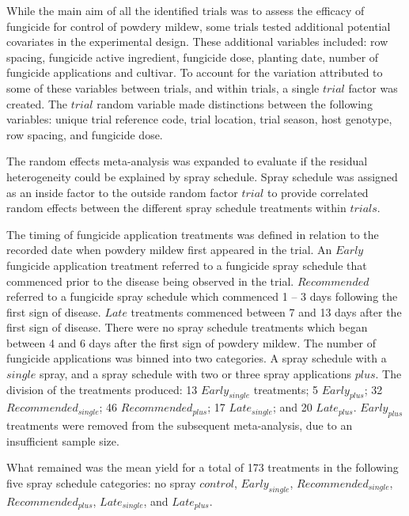 \documentclass[agronomy,article,submit,moreauthors,pdftex]{mdpi}
\begin{document}
While the main aim of all the identified trials was to assess the efficacy of fungicide for control of powdery mildew, some trials tested additional potential covariates in the experimental design.
These additional variables included: row spacing, fungicide active ingredient, fungicide dose, planting date, number of fungicide applications and cultivar.
To account for the variation attributed to some of these variables between trials, and within trials, a single \(trial\) factor was created.
The \(trial\) random variable made distinctions between the following variables: unique trial reference code, trial location, trial season, host genotype, row spacing, and fungicide dose.

The random effects meta-analysis was expanded to evaluate if the residual heterogeneity could be explained by spray schedule.
Spray schedule was assigned as an inside factor to the outside random factor \(trial\) to provide correlated random effects between the different spray schedule treatments within \(trials\).

The timing of fungicide application treatments was defined in relation to the recorded date when powdery mildew first appeared in the trial.
An \(Early\) fungicide application treatment referred to a fungicide spray schedule that commenced prior to the disease being observed in the trial.
\(Recommended\) referred to a fungicide spray schedule which commenced 1 -- 3 days following the first sign of disease.
\(Late\) treatments commenced between 7 and 13 days after the first sign of disease.
There were no spray schedule treatments which began between 4 and 6 days after the first sign of powdery mildew.
The number of fungicide applications was binned into two categories.
A spray schedule with a \(single\) spray, and a spray schedule with two or three spray applications \(plus\).
The division of the treatments produced: 13 \(Early_{single}\) treatments; 5 \(Early_{plus}\); 32 \(Recommended_{single}\); 46 \(Recommended_{plus}\); 17 \(Late_{single}\); and 20 \(Late_{plus}\).
\(Early_{plus}\) treatments were removed from the subsequent meta-analysis, due to an insufficient sample size.

What remained was the mean yield for a total of 173 treatments in the following five spray schedule categories: no spray \(control\), \(Early_{single}\), \(Recommended_{single}\), \(Recommended_{plus}\), \(Late_{single}\), and \(Late_{plus}\).
\end{document}
